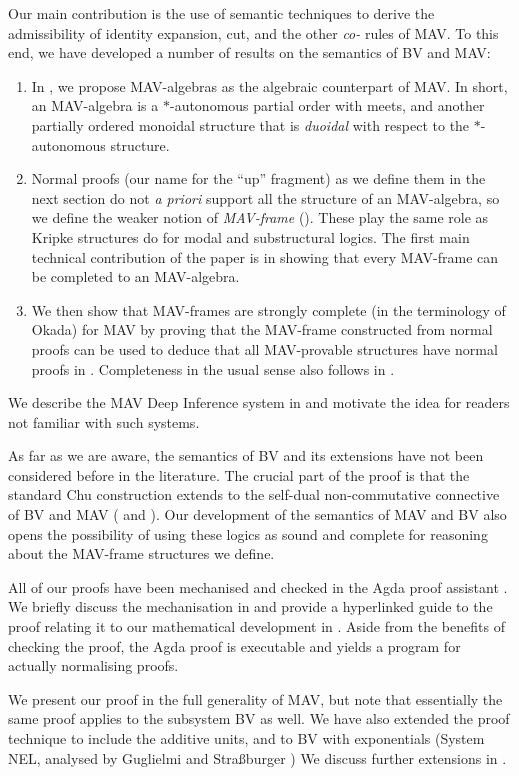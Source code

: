 Our main contribution is the use of semantic techniques to derive the admissibility of identity expansion, cut, and the other \emph{co-} rules of MAV. To this end, we have developed a number of results on the semantics of BV and MAV:
\begin{enumerate}
\item In , we propose MAV-algebras as the algebraic counterpart of MAV. In short, an MAV-algebra is a $*$-autonomous partial order with meets, and another partially ordered monoidal structure that is \emph{duoidal} with respect to the $*$-autonomous structure.
\item Normal proofs (our name for the ``up'' fragment) as we define them in the next section do not {\it a priori} support all the structure of an MAV-algebra, so we define the weaker notion of \emph{MAV-frame} (). These play the same role as Kripke structures do for modal and substructural logics. The first main technical contribution of the paper is in showing that every MAV-frame can be completed to an MAV-algebra.
\item We then show that MAV-frames are strongly complete (in the terminology of Okada) for MAV by proving that the MAV-frame constructed from normal proofs can be used to deduce that all MAV-provable structures have normal proofs in . Completeness in the usual sense also follows in .
\end{enumerate}

We describe the MAV Deep Inference system in  and motivate the idea for readers not familiar with such systems.

As far as we are aware, the semantics of BV and its extensions have not been considered before in the literature. The crucial part of the proof is that the standard Chu construction extends to the self-dual non-commutative connective of BV and MAV ( and ). Our development of the semantics of MAV and BV also opens the possibility of using these logics as sound and complete for reasoning about the MAV-frame structures we define.

All of our proofs have been mechanised and checked in the Agda proof assistant \cite{Agda264}. We briefly discuss the mechanisation in  and provide a hyperlinked guide to the proof relating it to our mathematical development in . Aside from the benefits of checking the proof, the Agda proof is executable and yields a program for actually normalising proofs.

We present our proof in the full generality of MAV, but note that essentially the same proof applies to the subsystem BV as well. We have also extended the proof technique to include the additive units, and to BV with exponentials (System NEL, analysed by Guglielmi and Stra{\ss}burger \cite{Burger_2011,GuglielmiS11}) We discuss further extensions in .
